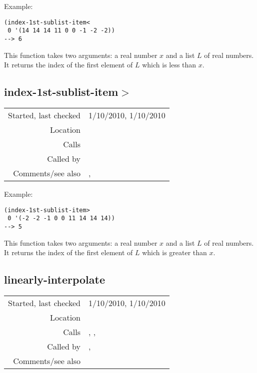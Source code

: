 \vspace{0.5cm}
\noindent Example:
\begin{verbatim}
(index-1st-sublist-item<
 0 '(14 14 14 11 0 0 -1 -2 -2))
--> 6
\end{verbatim}

\noindent This function takes two arguments: a real
number $x$ and a list $L$ of real numbers. It returns
the index of the first element of $L$ which is less
than $x$.


\subsection*{index-1st-sublist-item$>$}\label{fun:index-1st-sublist-item>}

\vspace{0.3cm}
\begin{tabular}{r|p{8cm}}
Started, last checked & 1/10/2010, 1/10/2010 \\
Location & \nameref{sec:interpolation} \\
Calls & \\
Called by & \nameref{fun:linearly-interpolate} \\
Comments/see also & \nameref{fun:index-nth-sublist-item>}, 
\newline \nameref{fun:index-1st-sublist-item>=}
\end{tabular}

\vspace{0.5cm}
\noindent Example:
\begin{verbatim}
(index-1st-sublist-item>
 0 '(-2 -2 -1 0 0 11 14 14 14))
--> 5
\end{verbatim}

\noindent This function takes two arguments: a real
number $x$ and a list $L$ of real numbers. It returns
the index of the first element of $L$ which is greater
than $x$.


\subsection*{linearly-interpolate}\label{fun:linearly-interpolate}

\vspace{0.3cm}
\begin{tabular}{r|p{8cm}}
Started, last checked & 1/10/2010, 1/10/2010 \\
Location & \nameref{sec:interpolation} \\
Calls & \nameref{fun:index-1st-sublist-item>}, \nameref{fun:my-last}, \newline \nameref{fun:nth-list-of-lists} \\
Called by & \nameref{fun:abs-differences-for-curves-at-points}, \nameref{fun:linearly-interpolate-x-values} \\
Comments/see also & 
\end{tabular}

